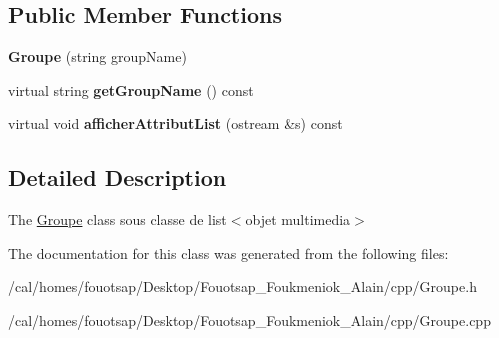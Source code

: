 \subsection*{Public Member Functions}
\begin{DoxyCompactItemize}
\item 
\hypertarget{class_groupe_a69bd7f1c9400e287c531c9b5f1da19cb}{{\bfseries Groupe} (string group\+Name)}\label{class_groupe_a69bd7f1c9400e287c531c9b5f1da19cb}

\item 
\hypertarget{class_groupe_a37f0f8e74f1826265933503de8a45583}{virtual string {\bfseries get\+Group\+Name} () const }\label{class_groupe_a37f0f8e74f1826265933503de8a45583}

\item 
\hypertarget{class_groupe_ab4d1294beccf02aba10b704ef9c296b9}{virtual void {\bfseries afficher\+Attribut\+List} (ostream \&s) const }\label{class_groupe_ab4d1294beccf02aba10b704ef9c296b9}

\end{DoxyCompactItemize}


\subsection{Detailed Description}
The \hyperlink{class_groupe}{Groupe} class sous classe de list$<$objet multimedia$>$ 

The documentation for this class was generated from the following files\+:\begin{DoxyCompactItemize}
\item 
/cal/homes/fouotsap/\+Desktop/\+Fouotsap\+\_\+\+Foukmeniok\+\_\+\+Alain/cpp/Groupe.\+h\item 
/cal/homes/fouotsap/\+Desktop/\+Fouotsap\+\_\+\+Foukmeniok\+\_\+\+Alain/cpp/Groupe.\+cpp\end{DoxyCompactItemize}
